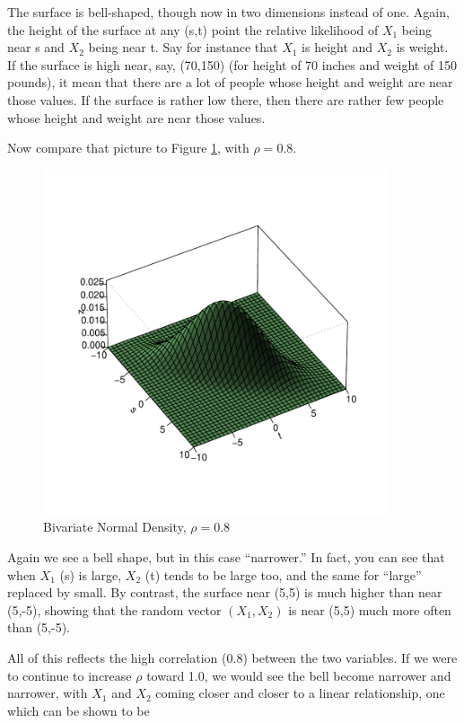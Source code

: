 The surface is bell-shaped, though now in two dimensions instead of one.
Again, the height of the surface at any (s,t) point the relative
likelihood of $X_1$ being near s and $X_2$ being near t.  Say for
instance that $X_1$ is height and $X_2$ is weight.  If the surface is
high near, say, (70,150) (for height of 70 inches and weight of 150
pounds), it mean that there are a lot of people whose height and weight
are near those values.  If the surface is rather low there, then there
are rather few people whose height and weight are near those values.

Now compare that picture to Figure \ref{rho8}, with $\rho = 0.8$.

\begin{figure}
\centerline{
\includegraphics[width=4in]{Rho8.pdf}
}
\caption{Bivariate Normal Density, $\rho=0.8$}
\label{rho8}
\end{figure}

Again we see a bell shape, but in this case ``narrower.''  In fact, you
can see that when $X_1$ (s) is large, $X_2$ (t) tends to be large too,
and the same for ``large'' replaced by small.  By contrast, the surface
near (5,5) is much higher than near (5,-5), showing that the random
vector $(X_1, X_2)$ is near (5,5) much more often than (5,-5).

All of this reflects the high correlation (0.8) between the two variables.
If we were to continue to increase $\rho$ toward 1.0, we would see the
bell become narrower and narrower, with $X_1$ and $X_2$ coming closer
and closer to a linear relationship, one which can be shown to be

